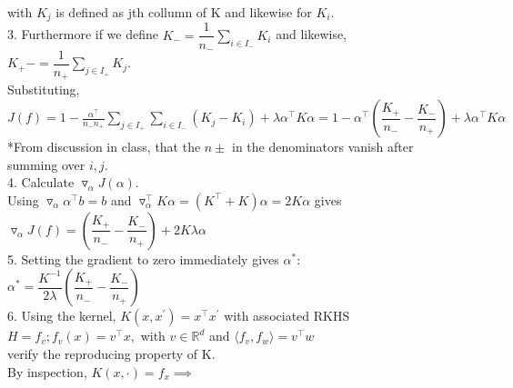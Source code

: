 \documentclass[18pt]{article}
\begin{document}
\begin{flushleft}
\vspace{.4cm}
with $K_j$ is defined as jth collumn of K and likewise for $K_i$.\\
3. Furthermore if we define $K_-=\dfrac{1}{n_-}\sum\limits_{i \in I_-} K_i$ and likewise, $K_+-=\dfrac{1}{n_+}\sum\limits_{j \in I_+} K_j$.\\
Substituting,\\
\vspace{.4cm}
$J(f)=1- \frac{\alpha^{\top}}{ n_{-} n_{+}} \sum\limits_{j \in I_+}\sum\limits_{i \in I_-}\left(K_{j}-K_{i} \right)+\lambda\alpha^{\top}K \alpha=1-\alpha^{\top}\left(\dfrac{K_+}{n_{-}}-\dfrac{K_-}{n_{+}}\right)+\lambda\alpha^{\top}K \alpha$\\
\vspace{.4cm}
*From discussion in class, that the $n\pm$ in the denominators vanish after summing over $i,j$.\\
\vspace{.4cm}
4. Calculate $\triangledown_\alpha J(\alpha)$.\\
\vspace{.4cm}
Using $\triangledown_\alpha \alpha^{\top}b=b$ and $\triangledown_\alpha^{\top} K \alpha=(K^\top+K) \alpha=2K\alpha$ gives\\
\vspace{.4cm}
\hspace{3cm} $\triangledown_\alpha J(f)=\left(\dfrac{K_+}{n_{-}}-\dfrac{K_-}{n_{+}}\right)+2K\lambda \alpha$\\
\vspace{.4cm}
5. Setting the gradient to zero immediately gives $\alpha^*$:\\
\vspace{.4cm}
\hspace{3cm} $\alpha^*=\dfrac{K^{-1}}{2 \lambda}\left(\dfrac{K_+}{n_{-}}-\dfrac{K_-}{n_{+}}\right)$\\
\vspace{.4cm}
6. Using the kernel, $K(x,x^{\prime})=x^{\top}x^{\prime}$ with associated RKHS\\
\vspace{.4cm}
\hspace{1cm} $H={f_v; f_v(x)=v^{\top}}x,$ with $v \in \mathbb{R}^d$ and $\langle f_v,f_w \rangle=v^{\top}w$\\
\vspace{.4cm}
verify the reproducing property of K.\\
\vspace{.4cm}
By inspection, $K(x,\cdot)=f_x \implies $\\

\end{flushleft}
\end{document}
